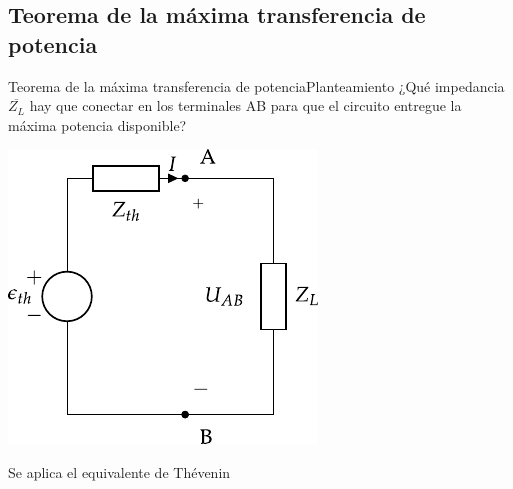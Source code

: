 \documentclass[aspectratio=169, xcolor={usenames,svgnames,dvipsnames}]{beamer}
\begin{document}
\subsection{Teorema de la máxima transferencia de potencia}

\begin{frame}{Teorema de la máxima transferencia de potencia}{Planteamiento}
¿Qué impedancia \(\overline{Z_L}\) hay que conectar en los terminales AB para que el circuito entregue la \alert{máxima potencia disponible}?

\begin{center}
\includegraphics[height=0.55\textheight]{../figs/EquivalenteThevenin2.pdf}
\end{center}

Se aplica el \alert{equivalente de Thévenin}
\end{frame}
\end{document}

